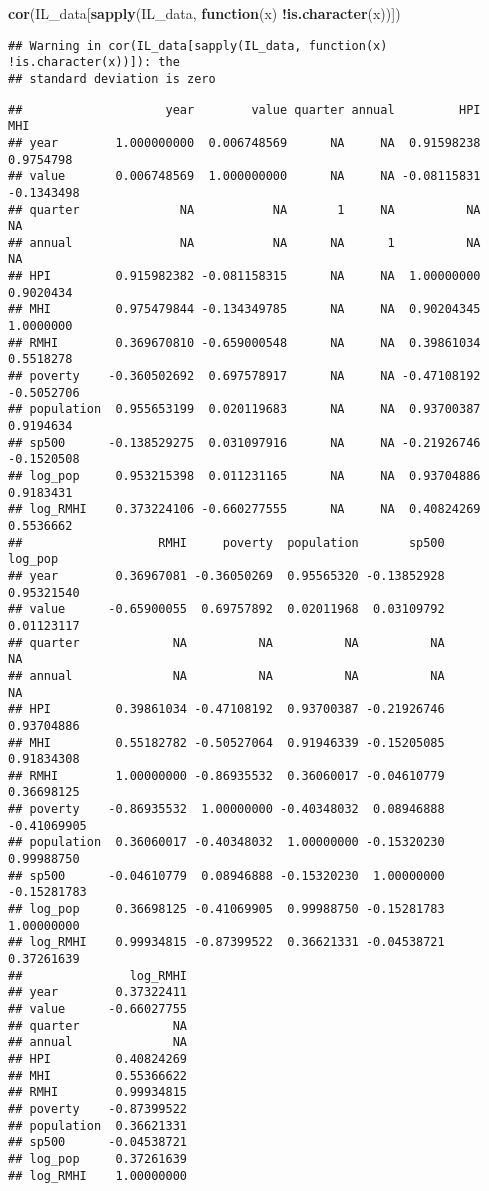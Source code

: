 \documentclass[
]{article}
\newenvironment{Shaded}{\begin{snugshade}}{\end{snugshade}}
\newcommand{\ControlFlowTok}[1]{\textcolor[rgb]{0.13,0.29,0.53}{\textbf{#1}}}
\newcommand{\KeywordTok}[1]{\textcolor[rgb]{0.13,0.29,0.53}{\textbf{#1}}}
\newcommand{\NormalTok}[1]{#1}
\newcommand{\OperatorTok}[1]{\textcolor[rgb]{0.81,0.36,0.00}{\textbf{#1}}}
\begin{document}
\begin{Shaded}
\begin{Highlighting}[]
\KeywordTok{cor}\NormalTok{(IL_data[}\KeywordTok{sapply}\NormalTok{(IL_data, }\ControlFlowTok{function}\NormalTok{(x) }\OperatorTok{!}\KeywordTok{is.character}\NormalTok{(x))])}
\end{Highlighting}
\end{Shaded}

\begin{verbatim}
## Warning in cor(IL_data[sapply(IL_data, function(x) !is.character(x))]): the
## standard deviation is zero
\end{verbatim}

\begin{verbatim}
##                    year        value quarter annual         HPI        MHI
## year        1.000000000  0.006748569      NA     NA  0.91598238  0.9754798
## value       0.006748569  1.000000000      NA     NA -0.08115831 -0.1343498
## quarter              NA           NA       1     NA          NA         NA
## annual               NA           NA      NA      1          NA         NA
## HPI         0.915982382 -0.081158315      NA     NA  1.00000000  0.9020434
## MHI         0.975479844 -0.134349785      NA     NA  0.90204345  1.0000000
## RMHI        0.369670810 -0.659000548      NA     NA  0.39861034  0.5518278
## poverty    -0.360502692  0.697578917      NA     NA -0.47108192 -0.5052706
## population  0.955653199  0.020119683      NA     NA  0.93700387  0.9194634
## sp500      -0.138529275  0.031097916      NA     NA -0.21926746 -0.1520508
## log_pop     0.953215398  0.011231165      NA     NA  0.93704886  0.9183431
## log_RMHI    0.373224106 -0.660277555      NA     NA  0.40824269  0.5536662
##                   RMHI     poverty  population       sp500     log_pop
## year        0.36967081 -0.36050269  0.95565320 -0.13852928  0.95321540
## value      -0.65900055  0.69757892  0.02011968  0.03109792  0.01123117
## quarter             NA          NA          NA          NA          NA
## annual              NA          NA          NA          NA          NA
## HPI         0.39861034 -0.47108192  0.93700387 -0.21926746  0.93704886
## MHI         0.55182782 -0.50527064  0.91946339 -0.15205085  0.91834308
## RMHI        1.00000000 -0.86935532  0.36060017 -0.04610779  0.36698125
## poverty    -0.86935532  1.00000000 -0.40348032  0.08946888 -0.41069905
## population  0.36060017 -0.40348032  1.00000000 -0.15320230  0.99988750
## sp500      -0.04610779  0.08946888 -0.15320230  1.00000000 -0.15281783
## log_pop     0.36698125 -0.41069905  0.99988750 -0.15281783  1.00000000
## log_RMHI    0.99934815 -0.87399522  0.36621331 -0.04538721  0.37261639
##               log_RMHI
## year        0.37322411
## value      -0.66027755
## quarter             NA
## annual              NA
## HPI         0.40824269
## MHI         0.55366622
## RMHI        0.99934815
## poverty    -0.87399522
## population  0.36621331
## sp500      -0.04538721
## log_pop     0.37261639
## log_RMHI    1.00000000
\end{verbatim}
\end{document}
